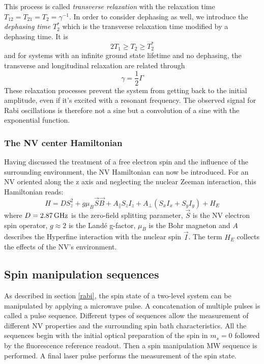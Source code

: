 \documentclass[12pt,a4paper]{article}
\begin{document}
This process is called \textit{transverse relaxation} with the relaxation time $T_{12}=T_{21}=T_2=\gamma^{-1}$. In order to consider dephasing as well, we introduce the \textit{dephasing time} $T_2^*$ which is the transverse relaxation time modified by a dephasing time. It is \cite{ttwo}
\begin{equation}
2T_1\geq T_2\geq T_2^*
\end{equation} 
and for systems with an infinite ground state lifetime and no dephasing, the transverse and longitudinal relaxation are related through
\begin{equation}
\gamma=\frac{1}{2}\Gamma
\end{equation} 
These relaxation processes prevent the system from getting back to the initial amplitude, even if it's excited with a resonant frequency. The observed signal for Rabi oscillations is therefore not a sine but a convolution of a sine with the exponential function.
\newpage
\subsubsection{The NV center Hamiltonian}\label{ham}
Having discussed the treatment of a free electron spin and the influence of the surrounding environment, the NV Hamiltonian can now be introduced. For an NV oriented along the z axis and neglecting the nuclear Zeeman interaction, this Hamiltonian reads\cite{nv1}:
\begin{equation}
H=DS_z^2+g\mu_B\vec{S}\vec{B}+A_\parallel S_zI_z+A_\perp(S_xI_x+S_yI_y)+H_E
\end{equation}
where $D=\unit[2.87]{GHz}$ is the zero-field splitting parameter, $\vec{S}$ is the NV electron spin operator, $g\approx 2$ is the Land\'{e} g-factor, $\mu_B$ is the Bohr magneton and $A$ describes the Hyperfine interaction with the nuclear spin $\vec{I}$. The term $H_E$ collects the effects of the NV's environment. 
\subsection{Spin manipulation sequences}
As described in section \ref{rabi}, the spin state of a two-level system can be manipulated by applying a microwave pulse. A concatenation of multiple pulses is called a pulse sequence.
Different types of sequences allow the measurement of different NV properties and the surrounding spin bath characteristics. All the sequences begin with the initial optical preparation of the spin in $m_s=0$ followed by the fluorescence reference readout. Then a spin manipulation MW sequence is performed. A final laser pulse performs the measurement of the spin state.
\end{document}
